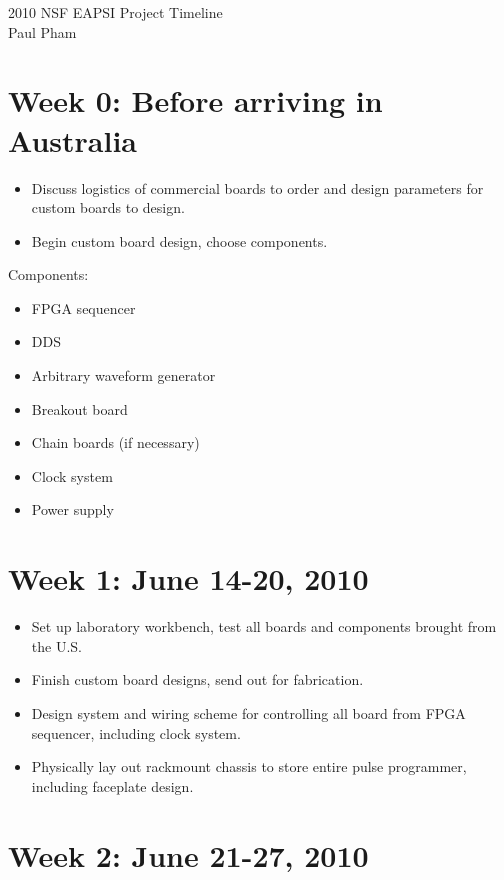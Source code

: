 \documentclass{article}
\begin{document}
\begin{center}
\LARGE{2010 NSF EAPSI Project Timeline}\\
\Large{Paul Pham}
\end{center}

\section{Week 0: Before arriving in Australia}

\begin{itemize}
\item
Discuss logistics of commercial boards to order and design parameters for
custom boards to design.
\item
Begin custom board design, choose components.
\end{itemize}

Components:
\begin{itemize}
\item
FPGA sequencer
\item DDS
\item Arbitrary waveform generator
\item Breakout board
\item Chain boards (if necessary)
\item Clock system
\item Power supply
\end{itemize}

\section{Week 1: June 14-20, 2010}

\begin{itemize}
\item
Set up laboratory workbench, test all boards and components brought from the U.S.
\item
Finish custom board designs, send out for fabrication.
\item
Design system and wiring scheme for controlling all board from FPGA sequencer,
including clock system.
\item
Physically lay out rackmount chassis to store entire pulse programmer,
including faceplate design.
\end{itemize}

\section{Week 2: June 21-27, 2010}
\end{document}
